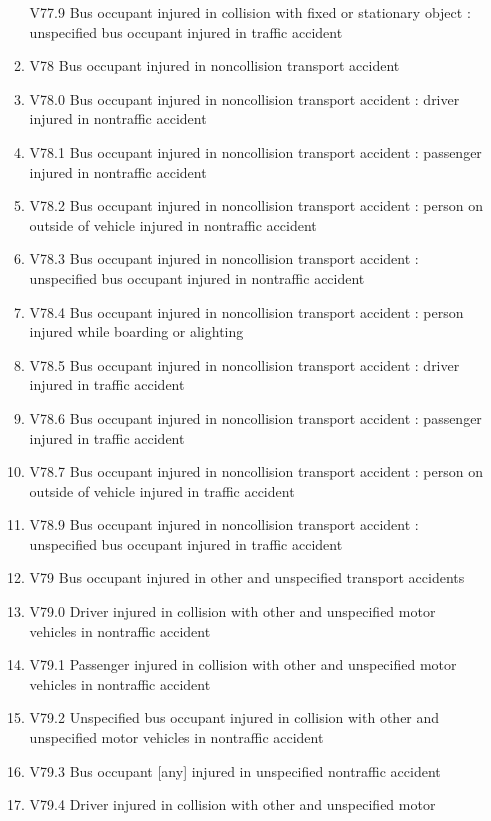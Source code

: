 \documentclass[
]{scrartcl}
\begin{document}
\begin{itemize}
\begin{enumerate}
    V77.9 Bus occupant injured in collision with fixed or stationary
    object : unspecified bus occupant injured in traffic accident
  \item
    V78 Bus occupant injured in noncollision transport accident
  \item
    V78.0 Bus occupant injured in noncollision transport accident :
    driver injured in nontraffic accident
  \item
    V78.1 Bus occupant injured in noncollision transport accident :
    passenger injured in nontraffic accident
  \item
    V78.2 Bus occupant injured in noncollision transport accident :
    person on outside of vehicle injured in nontraffic accident
  \item
    V78.3 Bus occupant injured in noncollision transport accident :
    unspecified bus occupant injured in nontraffic accident
  \item
    V78.4 Bus occupant injured in noncollision transport accident :
    person injured while boarding or alighting
  \item
    V78.5 Bus occupant injured in noncollision transport accident :
    driver injured in traffic accident
  \item
    V78.6 Bus occupant injured in noncollision transport accident :
    passenger injured in traffic accident
  \item
    V78.7 Bus occupant injured in noncollision transport accident :
    person on outside of vehicle injured in traffic accident
  \item
    V78.9 Bus occupant injured in noncollision transport accident :
    unspecified bus occupant injured in traffic accident
  \item
    V79 Bus occupant injured in other and unspecified transport
    accidents
  \item
    V79.0 Driver injured in collision with other and unspecified motor
    vehicles in nontraffic accident
  \item
    V79.1 Passenger injured in collision with other and unspecified
    motor vehicles in nontraffic accident
  \item
    V79.2 Unspecified bus occupant injured in collision with other and
    unspecified motor vehicles in nontraffic accident
  \item
    V79.3 Bus occupant {[}any{]} injured in unspecified nontraffic
    accident
  \item
    V79.4 Driver injured in collision with other and unspecified motor

\end{enumerate}
\end{itemize}
\end{document}
